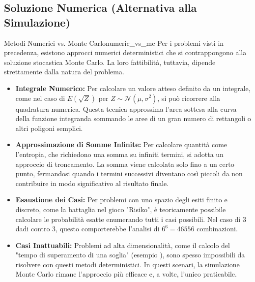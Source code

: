 \subsection{Soluzione Numerica (Alternativa alla Simulazione)}
\begin{nota}{Metodi Numerici vs. Monte Carlo}{numeric_vs_mc}
Per i problemi visti in precedenza, esistono approcci numerici deterministici
che si contrappongono alla soluzione stocastica Monte Carlo. La loro
fattibilità, tuttavia, dipende strettamente dalla natura del problema.

\begin{itemize}
    \item \textbf{Integrale Numerico:} Per calcolare un valore atteso definito
    da un integrale, come nel caso di \(E(\sqrt{Z})\) per \(Z \sim
    \mathcal{N}(\mu, \sigma^2)\), si può ricorrere alla quadratura numerica.
    Questa tecnica approssima l'area sottesa alla curva della funzione
    integranda sommando le aree di un gran numero di rettangoli o altri poligoni
    semplici.

    \item \textbf{Approssimazione di Somme Infinite:} Per calcolare quantità
    come l'entropia, che richiedono una somma su infiniti termini, si adotta un
    approccio di troncamento. La somma viene calcolata solo fino a un certo
    punto, fermandosi quando i termini successivi diventano così piccoli da non
    contribuire in modo significativo al risultato finale.

    \item \textbf{Esaustione dei Casi:} Per problemi con uno spazio degli esiti
    finito e discreto, come la battaglia nel gioco "Risiko", è teoricamente
    possibile calcolare le probabilità esatte enumerando tutti i casi
    possibili. Nel caso di 3 dadi contro 3, questo comporterebbe l'analisi di
    \(6^6 = 46556\) combinazioni.

    \item \textbf{Casi Inattuabili:} Problemi ad alta dimensionalità, come il
    calcolo del "tempo di superamento di una soglia" (esempio
    ), sono spesso impossibili da risolvere con questi
    metodi deterministici. In questi scenari, la simulazione Monte Carlo rimane
    l'approccio più efficace e, a volte, l'unico praticabile.
\end{itemize}
\end{nota}

